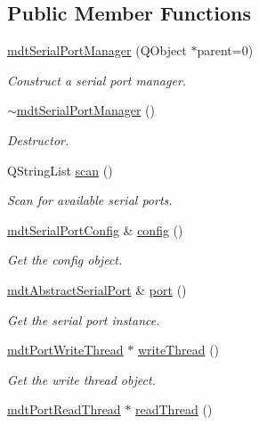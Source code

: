 \subsection*{Public Member Functions}
\begin{DoxyCompactItemize}
\item 
\hyperlink{classmdt_serial_port_manager_a6508372bcab37a73546fc2c24ee6415c}{mdtSerialPortManager} (QObject $\ast$parent=0)
\begin{DoxyCompactList}\small\item\em Construct a serial port manager. \end{DoxyCompactList}\item 
\hyperlink{classmdt_serial_port_manager_abde2c5990f3ec7daf41ebc35b4731c1d}{$\sim$mdtSerialPortManager} ()
\begin{DoxyCompactList}\small\item\em Destructor. \end{DoxyCompactList}\item 
QStringList \hyperlink{classmdt_serial_port_manager_a8b9c19a9b5a927e434a888b901a8ccff}{scan} ()
\begin{DoxyCompactList}\small\item\em Scan for available serial ports. \end{DoxyCompactList}\item 
\hyperlink{classmdt_serial_port_config}{mdtSerialPortConfig} \& \hyperlink{classmdt_serial_port_manager_a4b8ab7b9d53966a1887d9ce8557b8416}{config} ()
\begin{DoxyCompactList}\small\item\em Get the config object. \end{DoxyCompactList}\item 
\hyperlink{classmdt_abstract_serial_port}{mdtAbstractSerialPort} \& \hyperlink{classmdt_serial_port_manager_aa96937c2123fe4353b948b848d3e064d}{port} ()
\begin{DoxyCompactList}\small\item\em Get the serial port instance. \end{DoxyCompactList}\item 
\hypertarget{classmdt_serial_port_manager_a3a19cbca4adb7583b11a14d59e61233d}{
\hyperlink{classmdt_port_write_thread}{mdtPortWriteThread} $\ast$ \hyperlink{classmdt_serial_port_manager_a3a19cbca4adb7583b11a14d59e61233d}{writeThread} ()}
\label{classmdt_serial_port_manager_a3a19cbca4adb7583b11a14d59e61233d}

\begin{DoxyCompactList}\small\item\em Get the write thread object. \end{DoxyCompactList}\item 
\hypertarget{classmdt_serial_port_manager_aec192819e19f4679c7bba4ea37154aaf}{
\hyperlink{classmdt_port_read_thread}{mdtPortReadThread} $\ast$ \hyperlink{classmdt_serial_port_manager_aec192819e19f4679c7bba4ea37154aaf}{readThread} ()}
\label{classmdt_serial_port_manager_aec192819e19f4679c7bba4ea37154aaf}


\end{DoxyCompactItemize}
